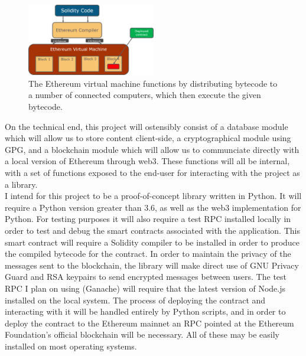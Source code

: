 \documentclass[]{report}
\begin{document}
\begin{figure}[h]
    \centering
    \includegraphics[width=0.5\textwidth]{ethereum}
    \caption{The Ethereum virtual machine functions by distributing bytecode to a number of connected computers, which then execute the given bytecode.}
\end{figure}

On the technical end, this project will ostensibly consist of a database module which will allow us to store content client-side, a cryptographical module using GPG, and a blockchain module which will allow us to communciate directly with a local version of Ethereum through web3. These functions will all be internal, with a set of functions exposed to the end-user for interacting with the project as a library.\\

I intend for this project to be a proof-of-concept library written in Python. It will require a Python version greater than 3.6, as well as the \gls{web3} implementation for Python.\cite{web3-py} For testing purposes it will also require a \gls{test RPC} installed locally in order to test and debug the \gls{smart contract}s associated with the application. This smart contract will require a Solidity compiler to be installed in order to produce the compiled bytecode for the contract. In order to maintain the privacy of the messages sent to the blockchain, the library will make direct use of GNU Privacy Guard and RSA keypairs to send encrypted messages between users. The test RPC I plan on using (Ganache) will require that the latest version of Node.js installed on the local system. The process of deploying the contract and interacting with it will be handled entirely by Python scripts, and in order to deploy the contract to the Ethereum \gls{mainnet} an RPC pointed at the Ethereum Foundation's official blockchain will be necessary. All of these may be easily installed on most operating systems.\\
\end{document}
